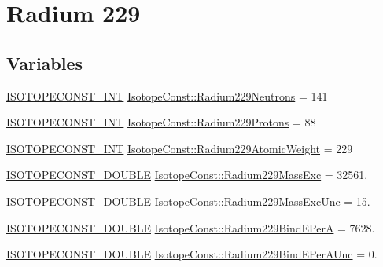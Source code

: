 \hypertarget{group___isotope_const-_radium-_ra229}{}\section{Radium 229}
\label{group___isotope_const-_radium-_ra229}
\subsection*{Variables}
\begin{DoxyCompactItemize}
\item 
\mbox{\hyperlink{group___isotope_const-_macros_ga5f18360b3e99483a35c32d789e62621c}{I\+S\+O\+T\+O\+P\+E\+C\+O\+N\+S\+T\+\_\+\+I\+NT}} \mbox{\hyperlink{group___isotope_const-_radium-_ra229_ga1deb2f9bf1127aaefbe99d9f4d830a82}{Isotope\+Const\+::\+Radium229\+Neutrons}} = 141
\item 
\mbox{\hyperlink{group___isotope_const-_macros_ga5f18360b3e99483a35c32d789e62621c}{I\+S\+O\+T\+O\+P\+E\+C\+O\+N\+S\+T\+\_\+\+I\+NT}} \mbox{\hyperlink{group___isotope_const-_radium-_ra229_ga89d620f8a0871a7e46f15b66ec5d9be5}{Isotope\+Const\+::\+Radium229\+Protons}} = 88
\item 
\mbox{\hyperlink{group___isotope_const-_macros_ga5f18360b3e99483a35c32d789e62621c}{I\+S\+O\+T\+O\+P\+E\+C\+O\+N\+S\+T\+\_\+\+I\+NT}} \mbox{\hyperlink{group___isotope_const-_radium-_ra229_gafe234b74416555d18ff97921ebd40f95}{Isotope\+Const\+::\+Radium229\+Atomic\+Weight}} = 229
\item 
\mbox{\hyperlink{group___isotope_const-_macros_ga8f45a7272ce02c0b4c65c44636ed719a}{I\+S\+O\+T\+O\+P\+E\+C\+O\+N\+S\+T\+\_\+\+D\+O\+U\+B\+LE}} \mbox{\hyperlink{group___isotope_const-_radium-_ra229_gaa78b4cd9894beb61564ef52008b0f259}{Isotope\+Const\+::\+Radium229\+Mass\+Exc}} = 32561.
\item 
\mbox{\hyperlink{group___isotope_const-_macros_ga8f45a7272ce02c0b4c65c44636ed719a}{I\+S\+O\+T\+O\+P\+E\+C\+O\+N\+S\+T\+\_\+\+D\+O\+U\+B\+LE}} \mbox{\hyperlink{group___isotope_const-_radium-_ra229_gaa420d27228d81ab71e3b0b85c2cd563d}{Isotope\+Const\+::\+Radium229\+Mass\+Exc\+Unc}} = 15.
\item 
\mbox{\hyperlink{group___isotope_const-_macros_ga8f45a7272ce02c0b4c65c44636ed719a}{I\+S\+O\+T\+O\+P\+E\+C\+O\+N\+S\+T\+\_\+\+D\+O\+U\+B\+LE}} \mbox{\hyperlink{group___isotope_const-_radium-_ra229_gac808c22840cc343fa08357ace76bdce8}{Isotope\+Const\+::\+Radium229\+Bind\+E\+PerA}} = 7628.
\item 
\mbox{\hyperlink{group___isotope_const-_macros_ga8f45a7272ce02c0b4c65c44636ed719a}{I\+S\+O\+T\+O\+P\+E\+C\+O\+N\+S\+T\+\_\+\+D\+O\+U\+B\+LE}} \mbox{\hyperlink{group___isotope_const-_radium-_ra229_ga51cab1b82cd644eab75186a63a637898}{Isotope\+Const\+::\+Radium229\+Bind\+E\+Per\+A\+Unc}} = 0.

\end{DoxyCompactItemize}
